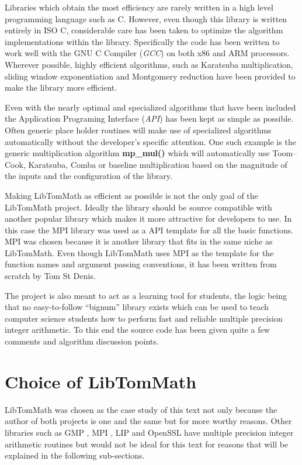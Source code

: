 \documentclass[b5paper]{book}
\begin{document}
Libraries which obtain the most efficiency are rarely written in a high level programming language such as C.  However, 
even though this library is written entirely in ISO C, considerable care has been taken to optimize the algorithm implementations within the 
library.  Specifically the code has been written to work well with the GNU C Compiler (\textit{GCC}) on both x86 and ARM 
processors.  Wherever possible, highly efficient algorithms, such as Karatsuba multiplication, sliding window 
exponentiation and Montgomery reduction have been provided to make the library more efficient.  

Even with the nearly optimal and specialized algorithms that have been included the Application Programing Interface 
(\textit{API}) has been kept as simple as possible.  Often generic place holder routines will make use of specialized 
algorithms automatically without the developer's specific attention.  One such example is the generic multiplication 
algorithm \textbf{mp\_mul()} which will automatically use Toom--Cook, Karatsuba, Comba or baseline multiplication 
based on the magnitude of the inputs and the configuration of the library.  

Making LibTomMath as efficient as possible is not the only goal of the LibTomMath project.  Ideally the library should 
be source compatible with another popular library which makes it more attractive for developers to use.  In this case the
MPI library was used as a API template for all the basic functions.  MPI was chosen because it is another library that fits 
in the same niche as LibTomMath.  Even though LibTomMath uses MPI as the template for the function names and argument 
passing conventions, it has been written from scratch by Tom St Denis.

The project is also meant to act as a learning tool for students, the logic being that no easy-to-follow ``bignum'' 
library exists which can be used to teach computer science students how to perform fast and reliable multiple precision 
integer arithmetic.  To this end the source code has been given quite a few comments and algorithm discussion points.  

\section{Choice of LibTomMath}
LibTomMath was chosen as the case study of this text not only because the author of both projects is one and the same but
for more worthy reasons.  Other libraries such as GMP \cite{GMP}, MPI \cite{MPI}, LIP \cite{LIP} and OpenSSL 
\cite{OPENSSL} have multiple precision integer arithmetic routines but would not be ideal for this text for 
reasons that will be explained in the following sub-sections.
\end{document}
